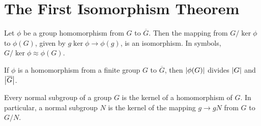 \section{The First Isomorphism Theorem}

\begin{theorem}
	Let $\phi$ be a group homomorphism from $G$ to $\overline{G}$. Then the mapping from $G/\ker\phi$ to $\phi(G)$, given by $g\ker\phi \to \phi(g)$, is an isomorphism. In symbols, $G/\ker\phi \approx \phi(G)$.
\end{theorem}

\begin{corollary}
	If $\phi$ is a homomorphism from a finite group $G$ to $\overline{G}$, then $\left\lvert \phi(G) \right\rvert$ divides $\left\lvert G \right\rvert$ and $\left\lvert \overline{G} \right\rvert$.
\end{corollary}

\begin{theorem}
	Every normal subgroup of a group $G$ is the kernel of a homomorphism of $G$. In particular, a normal subgroup $N$ is the kernel of the mapping $g \to gN$ from $G$ to $G/N$.
\end{theorem}
